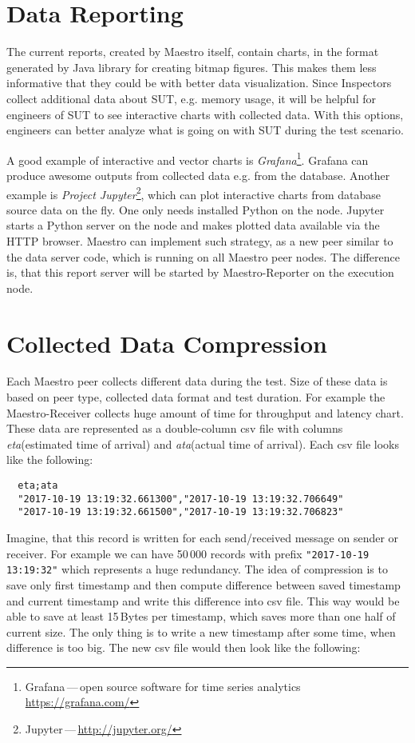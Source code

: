 \section{Data Reporting}
The current reports, created by Maestro itself, contain charts, in the  format generated by Java library for creating bitmap figures. This makes them less informative that they could be with better data visualization. Since Inspectors collect additional data about SUT, e.g. memory usage, it will be helpful for engineers of SUT to see interactive charts with collected data. With this options, engineers can better analyze what is going on with SUT during the test scenario.

A good example of interactive and vector charts is \emph{Grafana}\footnote{Grafana\,---\,open source software for time series analytics \url{https://grafana.com/}}. Grafana can produce awesome outputs from collected data e.g. from the database. Another example is \emph{Project Jupyter}\footnote{Jupyter\,---\,\url{http://jupyter.org/}}, which can plot interactive charts from database source data on the fly. One only needs installed Python on the node. Jupyter starts a Python server on the node and makes plotted data available via the HTTP browser. Maestro can implement such strategy, as a new peer similar to the data server code, which is running on all Maestro peer nodes. The difference is, that this report server will be started by Maestro-Reporter on the execution node.

\section{Collected Data Compression}
Each Maestro peer collects different data during the test. Size of these data is based on peer type, collected data format and test duration. For example the Maestro-Receiver collects huge amount of time for throughput and latency chart. These data are represented as a double-column csv file with columns \emph{eta}(estimated time of arrival) and \emph{ata}(actual time of arrival). Each csv file looks like the following:

\begin{verbatim}
  eta;ata
  "2017-10-19 13:19:32.661300","2017-10-19 13:19:32.706649"
  "2017-10-19 13:19:32.661500","2017-10-19 13:19:32.706823"
\end{verbatim}

Imagine, that this record is written for each send/received message on sender or receiver. For example we can have 50\,000 records with prefix \texttt{"2017-10-19 13:19:32"} which represents a huge redundancy. The idea of compression is to save only first timestamp and then compute difference between saved timestamp and current timestamp and write this difference into csv file. This way would be able to save at least 15\,Bytes per timestamp, which saves more than one half of current size. The only thing is to write a new timestamp after some time, when difference is too big. The new csv file would then look like the following:

